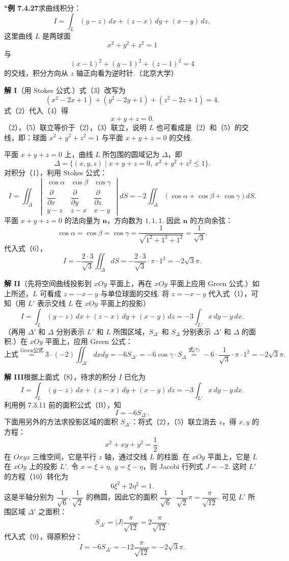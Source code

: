\documentclass[UTF8,12pt,a4paper,fontset=fandol]{ctexart}
\providecommand{\xlongequal}[1]{\overset{#1}{=}}
\begin{document}
\noindent\textbf{$*$例 7.4.27}\quad 求曲线积分：
\[
I=\int_L(y-z)\,dx+(z-x)\,dy+(x-y)\,dz, \tag{1}
\]
这里曲线 $L$ 是两球面
\[
x^2+y^2+z^2=1 \tag{2}
\]
与
\[
(x-1)^2+(y-1)^2+(z-1)^2=4 \tag{3}
\]
的交线，积分方向从 $z$ 轴正向看为逆时针.（北京大学）

\noindent\textbf{解 I}\quad （用 Stokes 公式.）式（3）改写为
\[
(x^2-2x+1)+(y^2-2y+1)+(z^2-2z+1)=4. \tag{4}
\]
式（2）代入（4）得
\[
x+y+z=0. \tag{5}
\]
（2），（5）联立等价于（2），（3）联立，说明 $L$ 也可看成是（2）和（5）的交线，即：球面 $x^2+y^2+z^2=1$ 与平面 $x+y+z=0$ 的交线.

平面 $x+y+z=0$ 上，曲线 $L$ 所包围的圆域记为 $\Delta$，即
\[
\Delta=\{(x,y,z)\mid x+y+z=0,\ x^2+y^2+z^2\le1\}.
\]
对积分（1），利用 Stokes 公式：
\[
I=\iint_\Delta
\begin{vmatrix}
\cos\alpha & \cos\beta & \cos\gamma\\
\dfrac{\partial}{\partial x} & \dfrac{\partial}{\partial y} & \dfrac{\partial}{\partial z}\\
y-z & z-x & x-y
\end{vmatrix}dS
=-2\iint_\Delta(\cos\alpha+\cos\beta+\cos\gamma)dS. \tag{6}
\]
平面 $x+y+z=0$ 的法向量为 $\mathbf n$，方向数为 $1,1,1$. 因此 $\mathbf n$ 的方向余弦：
\[
\cos\alpha=\cos\beta=\cos\gamma=\frac1{\sqrt{1^2+1^2+1^2}}=\frac1{\sqrt3}. \tag{7}
\]
代入式（6），
\[
I=-\frac{2\cdot3}{\sqrt3}\iint_\Delta dS
=-\frac{2\cdot3}{\sqrt3}\cdot\pi\cdot1^2=-2\sqrt3\pi.
\]

\noindent\textbf{解 II}\quad （先将空间曲线投影到 $xOy$ 平面上，再在 $xOy$ 平面上应用 Green 公式.）如上所述，$L$ 可看成 $z=-x-y$ 与单位球面的交线. 将 $z=-x-y$ 代入式（1），可知（用 $L'$ 表示交线 $L$ 在 $xOy$ 平面上的投影）
\[
I=\int_L(y-z)\,dx+(z-x)\,dy+(x-y)\,dz
=-3\int_{L'}x\,dy-y\,dx. \tag{8}
\]
（再用 $\Delta'$ 和 $\Delta$ 分别表示 $L'$ 和 $L$ 所围区域，$S_{\Delta'}$ 和 $S_\Delta$ 分别表示 $\Delta'$ 和 $\Delta$ 的面积.）在 $xOy$ 平面上，应用 Green 公式：
\[
\text{上式}\xlongequal{\text{Green公式}}3\cdot(-2)\iint_{\Delta'}dxdy
=-6S_{\Delta'}=-6\cos\gamma\cdot S_\Delta
\xlongequal{\text{式(7)}}-6\cdot\frac1{\sqrt3}\cdot\pi\cdot1^2=-2\sqrt3\pi.
\]

\noindent\textbf{解 III}\quad 根据上面式（8），待求的积分 $I$ 已化为
\[
I=\int_L(y-z)\,dx+(z-x)\,dy+(x-y)\,dz=-3\int_{L'}x\,dy-y\,dx.
\]
利用例 7.3.11 前的面积公式（B），知
\[
I=-6S_{\Delta'}. \tag{9}
\]
下面用另外的方法求投影区域的面积 $S_{\Delta'}$：将式（2），（5）联立消去 $z$，得 $x,y$ 的方程：
\[
x^2+xy+y^2=\frac12. \tag{10}
\]
在 $Oxyz$ 三维空间，它是平行 $z$ 轴，通过交线 $L$ 的柱面. 在 $xOy$ 平面上，它是 $L$ 在 $xOy$ 上的投影 $L'$. 令 $x=\xi+\eta,\ y=\xi-\eta$，则 Jacobi 行列式 $J=-2$. 这时 $L'$ 的方程（10）转化为
\[
6\xi^2+2\eta^2=1. \tag{11}
\]
这是半轴分别为 $\dfrac1{\sqrt6},\dfrac1{\sqrt2}$ 的椭圆，因此它的面积 $\dfrac1{\sqrt6}\cdot\dfrac1{\sqrt2}\pi=\dfrac\pi{\sqrt{12}}$. 可见 $L'$ 所围区域 $\Delta'$ 之面积：
\[
S_{\Delta'}=|J|\frac\pi{\sqrt{12}}=2\frac\pi{\sqrt{12}}.
\]
代入式（9），得原积分：
\[
I=-6S_{\Delta'}=-12\frac\pi{\sqrt{12}}=-2\sqrt3\pi.
\]
\end{document}
